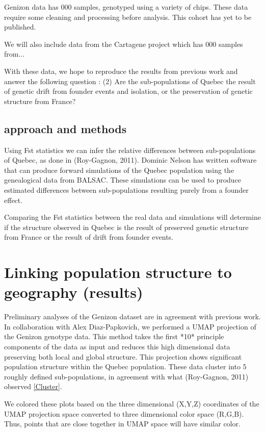 \documentclass[
11pt, %
oneside, %
english, %
doublespacing, %
headsepline, %
]{MastersDoctoralThesis} %
\begin{document}
Genizon data has 000 samples, genotyped using a variety of chips. These data require some cleaning and processing before analysis. This cohort has yet to be published. 

We will also include data from the Cartagene project which has 000 samples from...

With these data, we hope to reproduce the results from previous work and answer the following question :
(2) Are the sub-populations of Quebec the result of genetic drift from founder events and isolation, or the preservation of genetic structure from France?

\subsection{approach and methods}
Using Fst statistics we can infer the relative differences between sub-populations of Quebec, as done in (Roy-Gagnon, 2011).
Dominic Nelson has written software that can produce forward simulations of the Quebec population using the genealogical data from BALSAC.
These simulations can be used to produce estimated differences between sub-populations resulting purely from a founder effect.

Comparing the Fst statistics between the real data and simulations will determine if the structure observed in Quebec is the result of preserved genetic structure from France or the result of drift from founder events.

\section{Linking population structure to geography (results)}
Preliminary analyses of the Genizon dataset are in agreement with previous work.
In collaboration with Alex Diaz-Papkovich, we performed a UMAP projection of the Genizon genotype data.
This method takes the first *10* principle components of the data as input and reduces this high dimensional data preserving both local and global structure.
This projection shows significant population structure within the Quebec population. 
These data cluster into 5 roughly defined sub-populations, in agreement with what (Roy-Gagnon, 2011) observed \ref{Cluster}. 


We colored these plots based on the three dimensional (X,Y,Z) coordinates of the UMAP projection space converted to three dimensional color space (R,G,B).
Thus, points that are close together in UMAP space will have similar color.
\end{document}
